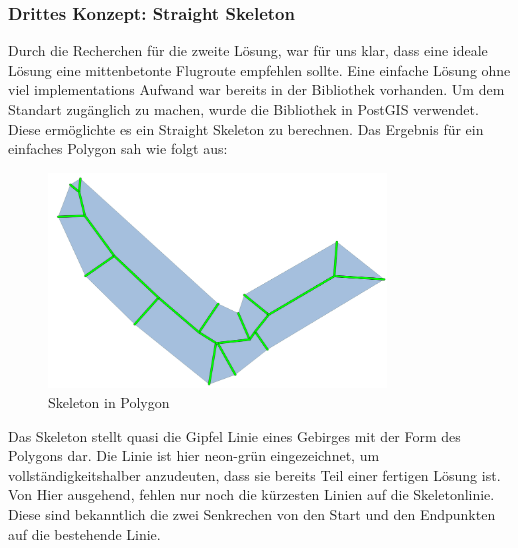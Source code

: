 \subsubsection{Drittes Konzept: Straight Skeleton}
Durch die Recherchen für die zweite Lösung, war für uns klar, dass eine ideale Lösung eine mittenbetonte Flugroute empfehlen sollte. Eine einfache Lösung ohne viel implementations Aufwand war bereits in der  Bibliothek vorhanden. Um  dem  Standart zugänglich zu machen, wurde die  Bibliothek in PostGIS verwendet. Diese ermöglichte es ein Straight Skeleton zu berechnen. Das Ergebnis für ein einfaches Polygon sah wie folgt aus:
\begin{figure}[h]
	\centering
	\includegraphics[width=0.8\textwidth]{images/routing/skeleton.png}
	\caption{Skeleton in Polygon}
	\label{fig:skeleton-in-polygon}
\end{figure}
Das Skeleton stellt quasi die Gipfel Linie eines Gebirges mit der Form des Polygons dar. Die Linie ist hier neon-grün eingezeichnet, um vollständigkeitshalber anzudeuten, dass sie bereits Teil einer fertigen Lösung ist. Von Hier ausgehend, fehlen nur noch die kürzesten Linien auf die Skeletonlinie. Diese sind bekanntlich die zwei Senkrechen von den Start und den Endpunkten auf die bestehende Linie. 


